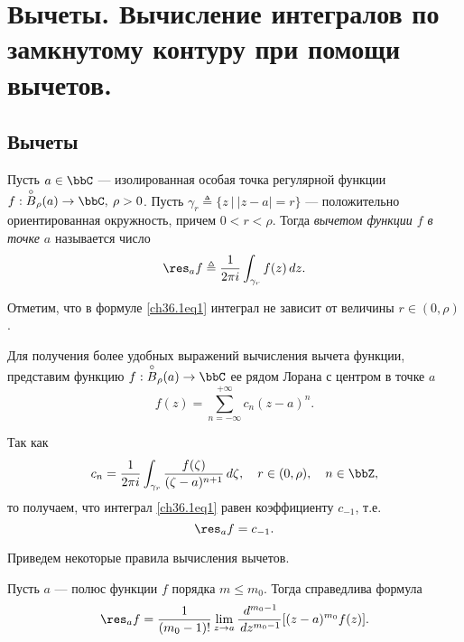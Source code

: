 \chapter{Вычеты. Вычисление интегралов по замкнутому контуру при помощи вычетов.}

\section{Вычеты}

\begin{leftbar}
\begin{defn}
Пусть $a \in \bbC$ --- изолированная особая точка регулярной функции $f : \overset{\circ}{B}_\rho(a) \to \bbC, \: \rho > 0$. Пусть $\gamma_r \triangleq \{ z \: \big| \: |z - a| = r\}$ --- положительно ориентированная окружность, причем $0 < r < \rho$. Тогда \textit{вычетом функции $f$ в точке $a$} называется число
\begin{equation} \label{ch36.1eq1}
\res_{a} f \triangleq \frac{1}{2\pi i} \int_{\gamma_r} f(z) \,dz.
\end{equation}
\end{defn}

Отметим, что в формуле \eqref{ch36.1eq1} интеграл не зависит от величины $r\in (0, \rho)$.

Для получения более удобных выражений вычисления вычета функции, представим функцию $f : \overset{\circ}{B}_\rho(a) \to \bbC$ ее рядом Лорана с центром в точке $a$
\begin{equation} \label{ch36.1eq2}
f(z) = \sum_{n = -\infty}^{+\infty} c_n (z - a)^n.
\end{equation}

Так как
$$
c_n = \frac{1}{2\pi i} \int_{\gamma_r} \frac{f(\zeta)}{(\zeta - a)^{n + 1}} \,d\zeta, \quad r \in (0, \rho), \quad n \in \bbZ,
$$
то получаем, что интеграл \eqref{ch36.1eq1} равен коэффициенту $c_{-1}$, т.е.
\begin{equation} \label{ch36.1eq3}
\res_{a} f = c_{-1}.
\end{equation}

Приведем некоторые правила вычисления вычетов.

\begin{lemm} \label{ch36.1lemm1}
Пусть $a$ --- полюс функции $f$ порядка $m \le m_0$. Тогда справедлива формула
\begin{equation} \label{ch36.1eq4}
\res_{a} f = \frac{1}{(m_0 - 1)!} \lim_{z \to a} \frac{\,d^{m_0 -1}}{\,dz^{m_0 - 1}} [(z - a)^{m_0} f(z)].
\end{equation}
\end{lemm}


\end{leftbar}
